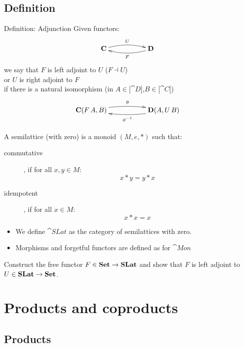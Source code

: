 \documentclass[handout]{beamer}
\begin{document}
\subsection{Definition}

\begin{frame}
  \begin{block}{Definition: Adjunction}
    Given functors:
    \[\xymatrix{
      \cat{C} \ar@/^/[rr]^U
      &&  \cat{D} \ar@/^/[ll]^{F}}\]
    we say that $F$ is left adjoint to $U$ ($F \dashv U$)\\
    or $U$ is right adjoint to $F$\\
    if there is a natural isomorphism
    (in $A\in|\cat{D}|$,$B\in|\cat{C}|$)
    \[\xymatrix{
    \hom{C}{F\,A}{B} \ar@/^/[rr]^\phi
      &&  \hom{D}{A}{U\,B}  \ar@/^/[ll]^{\phi^{-1}}
    }\]

  \end{block}
\end{frame}

\begin{frame}

  A semilattice (with zero) is a monoid $(M,e,*)$ such that:
  \begin{description}
  \item[commutative], if for all $x,y\in M$:
    \[x * y = y * x\]

  \item[idempotent], if for all $x\in M$:
    \[ x * x = x\]
  \end{description}

  \begin{itemize}
  \item We define $\cat{SLat}$ as the category of semilattices with zero.
  \item Morphisms and forgetful functors are defined as for $\cat{Mon}$ 
  \end{itemize}

  \begin{exercise}
    Construct the free functor $F\in\mathbf{Set}\to\mathbf{SLat}$ and show that 
    $F$ is left adjoint to $U\in\mathbf{SLat}\to\mathbf{Set}$.
  \end{exercise}

\end{frame}

\section{Products and coproducts}

\subsection{Products}
\end{document}
